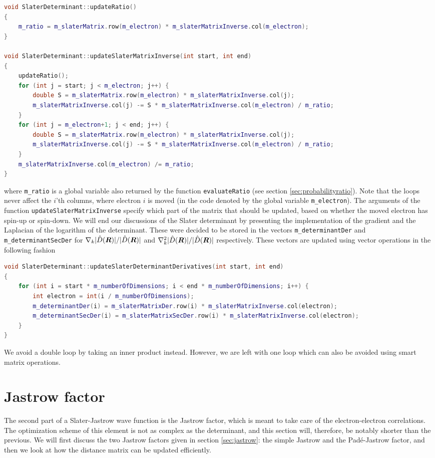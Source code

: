 \begin{lstlisting}[language={c++}]
void SlaterDeterminant::updateRatio()
{
	m_ratio = m_slaterMatrix.row(m_electron) * m_slaterMatrixInverse.col(m_electron);
}

void SlaterDeterminant::updateSlaterMatrixInverse(int start, int end)
{
	updateRatio();
	for (int j = start; j < m_electron; j++) {
		double S = m_slaterMatrix.row(m_electron) * m_slaterMatrixInverse.col(j);
		m_slaterMatrixInverse.col(j) -= S * m_slaterMatrixInverse.col(m_electron) / m_ratio;
	}
	for (int j = m_electron+1; j < end; j++) {
		double S = m_slaterMatrix.row(m_electron) * m_slaterMatrixInverse.col(j);
		m_slaterMatrixInverse.col(j) -= S * m_slaterMatrixInverse.col(m_electron) / m_ratio;
	}
	m_slaterMatrixInverse.col(m_electron) /= m_ratio;
}
\end{lstlisting}
where \lstinline{m_ratio} is a global variable also returned by the function \lstinline{evaluateRatio} (see section \ref{sec:probabilityratio}). Note that the loops never affect the $i$'th columns, where electron $i$ is moved (in the code denoted by the global variable \lstinline{m_electron}). The arguments of the function \lstinline{updateSlaterMatrixInverse} specify which part of the matrix that should be updated, based on whether the moved electron has spin-up or spin-down. We will end our discussions of the Slater determinant by presenting the implementation of the gradient and the Laplacian of the logarithm of the determinant. These were decided to be stored in the vectors \lstinline{m_determinantDer} and \lstinline{m_determinantSecDer} for $\nabla_k|\hat{D}(\boldsymbol{{R}})|/|\hat{D}(\boldsymbol{{R}})|$ and $\nabla_k^2|\hat{D}(\boldsymbol{{R}})|/|\hat{D}(\boldsymbol{{R}})|$ respectively. These vectors are updated using vector operations in the following fashion
\begin{lstlisting}[language={c++}]
void SlaterDeterminant::updateSlaterDeterminantDerivatives(int start, int end)
{
	for (int i = start * m_numberOfDimensions; i < end * m_numberOfDimensions; i++) {
		int electron = int(i / m_numberOfDimensions);
		m_determinantDer(i) = m_slaterMatrixDer.row(i) * m_slaterMatrixInverse.col(electron);
		m_determinantSecDer(i) = m_slaterMatrixSecDer.row(i) * m_slaterMatrixInverse.col(electron);
	}
}
\end{lstlisting}
We avoid a double loop by taking an inner product instead. However, we are left with one loop which can also be avoided using smart matrix operations.

\section{Jastrow factor}
The second part of a Slater-Jastrow wave function is the Jastrow factor, which is meant to take care of the electron-electron correlations. The optimization scheme of this element is not as complex as the determinant, and this section will, therefore, be notably shorter than the previous. We will first discuss the two Jastrow factors given in section \ref{sec:jastrow}: the simple Jastrow and the Padé-Jastrow factor, and then we look at how the distance matrix can be updated efficiently. 

